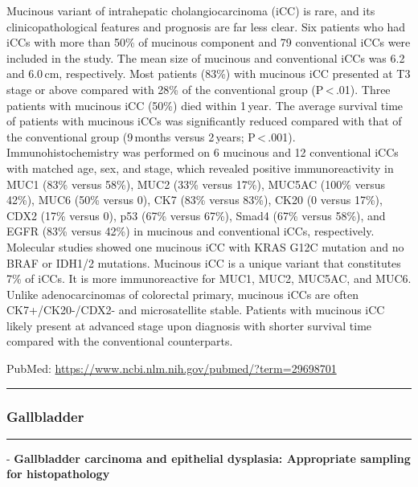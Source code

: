\documentclass[]{article}
\begin{document}
Mucinous variant of intrahepatic cholangiocarcinoma (iCC) is rare, and
its clinicopathological features and prognosis are far less clear. Six
patients who had iCCs with more than 50\% of mucinous component and 79
conventional iCCs were included in the study. The mean size of mucinous
and conventional iCCs was 6.2 and 6.0\,cm, respectively. Most patients
(83\%) with mucinous iCC presented at T3 stage or above compared with
28\% of the conventional group (P\,\textless{}\,.01). Three patients
with mucinous iCC (50\%) died within 1\,year. The average survival time
of patients with mucinous iCCs was significantly reduced compared with
that of the conventional group (9\,months versus 2\,years;
P\,\textless{}\,.001). Immunohistochemistry was performed on 6 mucinous
and 12 conventional iCCs with matched age, sex, and stage, which
revealed positive immunoreactivity in MUC1 (83\% versus 58\%), MUC2
(33\% versus 17\%), MUC5AC (100\% versus 42\%), MUC6 (50\% versus 0),
CK7 (83\% versus 83\%), CK20 (0 versus 17\%), CDX2 (17\% versus 0), p53
(67\% versus 67\%), Smad4 (67\% versus 58\%), and EGFR (83\% versus
42\%) in mucinous and conventional iCCs, respectively. Molecular studies
showed one mucinous iCC with KRAS G12C mutation and no BRAF or IDH1/2
mutations. Mucinous iCC is a unique variant that constitutes 7\% of
iCCs. It is more immunoreactive for MUC1, MUC2, MUC5AC, and MUC6. Unlike
adenocarcinomas of colorectal primary, mucinous iCCs are often
CK7+/CK20-/CDX2- and microsatellite stable. Patients with mucinous iCC
likely present at advanced stage upon diagnosis with shorter survival
time compared with the conventional counterparts.

PubMed: \url{https://www.ncbi.nlm.nih.gov/pubmed/?term=29698701}

{}

{}

\begin{center}\rule{0.5\linewidth}{\linethickness}\end{center}

\hypertarget{gallbladder}{%
\subsubsection{Gallbladder}\label{gallbladder}}

\begin{center}\rule{0.5\linewidth}{\linethickness}\end{center}

 - \textbf{Gallbladder carcinoma and epithelial dysplasia: Appropriate
sampling for histopathology}
\end{document}
